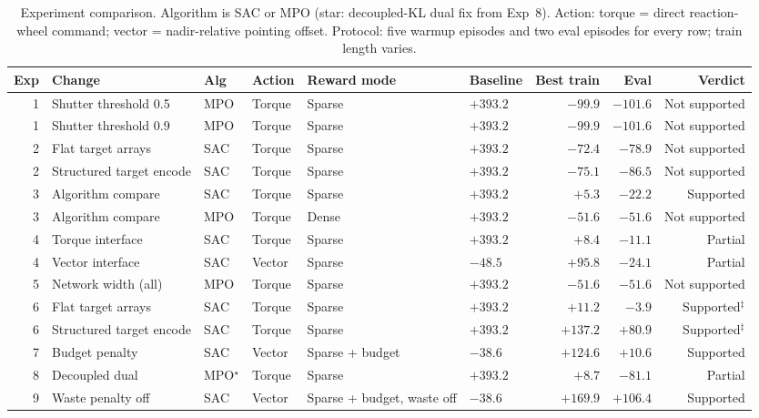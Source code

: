 \begin{table}[htbp]
  \centering
  \renewcommand{\arraystretch}{1.3}
  \caption{Experiment comparison.
    Algorithm is SAC or MPO (star: decoupled-KL dual fix from Exp~8).
    Action: torque = direct reaction-wheel command; vector = nadir-relative pointing offset.
    Protocol: five warmup episodes and two eval episodes for every row; train length varies.}
  \label{tab:exp-comparison}
  \scriptsize
  \setlength{\tabcolsep}{3.5pt}
  \begin{tabular}{rlllllrrr}
    \toprule
    Exp & Change & Alg & Action & Reward mode & Baseline & Best train & Eval & Verdict \\
    \midrule
    1 & Shutter threshold 0.5 & MPO & Torque & Sparse & $+393.2$ & $-99.9$ & $-101.6$ & Not supported \\
    1 & Shutter threshold 0.9 & MPO & Torque & Sparse & $+393.2$ & $-99.9$ & $-101.6$ & Not supported \\
    2 & Flat target arrays & SAC & Torque & Sparse & $+393.2$ & $-72.4$ & $-78.9$ & Not supported \\
    2 & Structured target encode & SAC & Torque & Sparse & $+393.2$ & $-75.1$ & $-86.5$ & Not supported \\
    3 & Algorithm compare & SAC & Torque & Sparse & $+393.2$ & $+5.3$ & $-22.2$ & Supported \\
    3 & Algorithm compare & MPO & Torque & Dense & $+393.2$ & $-51.6$ & $-51.6$ & Not supported \\
    4 & Torque interface & SAC & Torque & Sparse & $+393.2$ & $+8.4$ & $-11.1$ & Partial \\
    4 & Vector interface & SAC & Vector & Sparse & $-48.5$ & $+95.8$ & $-24.1$ & Partial \\
    5 & Network width (all) & MPO & Torque & Sparse & $+393.2$ & $-51.6$ & $-51.6$ & Not supported \\
    6 & Flat target arrays & SAC & Torque & Sparse & $+393.2$ & $+11.2$ & $-3.9$ & Supported$^\ddagger$ \\
    6 & Structured target encode & SAC & Torque & Sparse & $+393.2$ & $+137.2$ & $+80.9$ & Supported$^\ddagger$ \\
    7 & Budget penalty & SAC & Vector & Sparse + budget & $-38.6$ & $+124.6$ & $+10.6$ & Supported \\
    8 & Decoupled dual & MPO$^\star$ & Torque & Sparse & $+393.2$ & $+8.7$ & $-81.1$ & Partial \\
    9 & Waste penalty off & SAC & Vector & Sparse + budget, waste off & $-38.6$ & $+169.9$ & $+106.4$ & Supported \\

\end{tabular}
\end{table}
